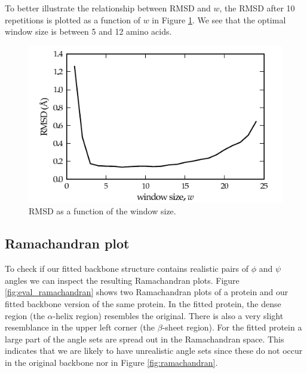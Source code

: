 To better illustrate the relationship between RMSD and $w$, the RMSD after 10 repetitions is plotted as a function of $w$ in Figure \ref{fig:rmsd_windowsize}.
We see that the optimal window size is between 5 and 12 amino acids.
\begin{figure}
	\centering
	\hspace*{-3.5mm}\includegraphics[width=1.1\columnwidth]{figures/plot_rmsd}
	\caption{RMSD as a function of the window size.}
	\label{fig:rmsd_windowsize}
\end{figure}



\subsection{Ramachandran plot}
To check if our fitted backbone structure contains realistic pairs of $\phi$ and $\psi$ angles we can inspect the resulting Ramachandran plots.
Figure \ref{fig:eval_ramachandran} shows two Ramachandran plots of a protein and our fitted backbone version of the same protein.
In the fitted protein, the dense region (the $\alpha$-helix region) resembles the original.
There is also a very slight resemblance in the upper left corner (the $\beta$-sheet region).
For the fitted protein a large part of the angle sets are spread out in the Ramachandran space.
This indicates that we are likely to have unrealistic angle sets since these do not occur in the original backbone nor in Figure \ref{fig:ramachandran}.

